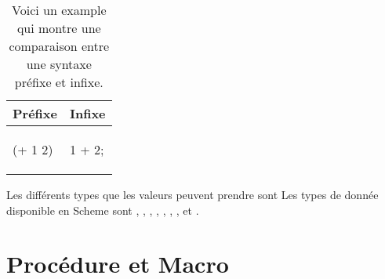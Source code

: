 \begin{table}[htbp]
\begin{center}
\begin{tabular}{|l|l|}
  \hline
  \textbf{Préfixe}& \textbf{Infixe}
  \\\hline

  \begin{mplisting}{0.1}
(+ 1 2)
\end{mplisting}&
  \begin{mplisting}{0.1}
1 + 2;
\end{mplisting}
\\\hline
\end{tabular}
\end{center}
  \caption{Voici un example qui montre une comparaison entre une syntaxe préfixe et infixe.}
  \label{tab:prefix_vs_infix}
\end{table}


Les différents types que les valeurs peuvent prendre sont Les types de donnée
disponible en Scheme sont , , ,
, , , ,
 et .

\section{Procédure et Macro}
\label{sec:proc_and_macro}

